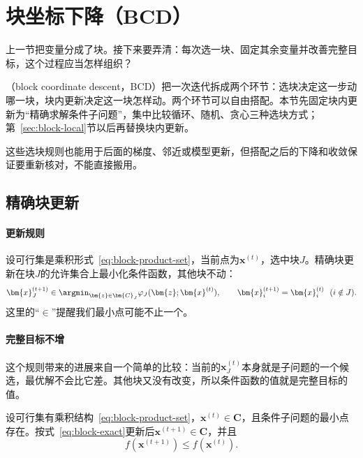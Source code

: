 \section{块坐标下降（BCD）}
\label{sec:block-bcd}

上一节把变量分成了块。接下来要弄清：每次选一块、固定其余变量并改善完整目标，这个过程应当怎样组织？

（block coordinate descent，BCD）把一次迭代拆成两个环节：选块决定这一步动哪一块，块内更新决定这一块怎样动。两个环节可以自由搭配。本节先固定块内更新为“精确求解条件子问题”，集中比较循环、随机、贪心三种选块方式；第~\ref{sec:block-local}节以后再替换块内更新。

这些选块规则也能用于后面的梯度、邻近或模型更新，但搭配之后的下降和收敛保证要重新核对，不能直接搬用。

\subsection{精确块更新}
\label{sec:block-exact}

\paragraph{更新规则}
设可行集是乘积形式~\eqref{eq:block-product-set}，当前点为$\bm{x}^{(t)}$，选中块$J$。精确块更新在块$J$的允许集合上最小化条件函数，其他块不动：
\begin{equation}
 \bm{x}_J^{(t+1)}\in\argmin_{\bm{z}\in\bm{C}_J}\varphi_J(\bm{z};\bm{x}^{(t)}),\qquad
 \bm{x}_{i}^{(t+1)}=\bm{x}_{i}^{(t)}\ \ (i\notin J).
 \label{eq:block-exact}
\end{equation}
这里的“$\in$”提醒我们最小点可能不止一个。

\paragraph{完整目标不增}
这个规则带来的进展来自一个简单的比较：当前的$\bm{x}_J^{(t)}$本身就是子问题的一个候选，最优解不会比它差。其他块又没有改变，所以条件函数的值就是完整目标的值。

\begin{lemma}[精确块更新的单调性]
\label{lem:block-exact-descent}
设可行集有乘积结构~\eqref{eq:block-product-set}，$\bm{x}^{(t)}\in\bm{C}$，且条件子问题的最小点存在。按式~\eqref{eq:block-exact}更新后$\bm{x}^{(t+1)}\in\bm{C}$，并且
\begin{equation}
 f(\bm{x}^{(t+1)})\leq f(\bm{x}^{(t)}).
 \label{eq:block-exact-monotone}
\end{equation}
\end{lemma}


